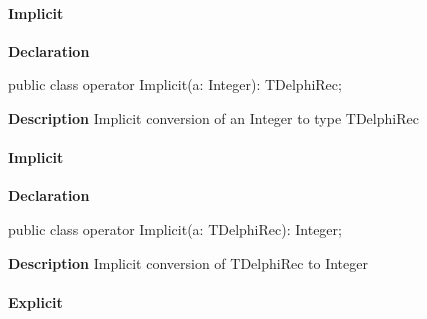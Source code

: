 \documentclass{report}
\begin{document}
\paragraph*{Implicit}\hspace*{\fill}

\begin{list}{}{
\setlength{\itemindent}{0cm}
\setlength{\listparindent}{0cm}
\setlength{\leftmargin}{\evensidemargin}
\addtolength{\leftmargin}{\tmplength}
\settowidth{\labelsep}{X}
\addtolength{\leftmargin}{\labelsep}
\setlength{\labelwidth}{\tmplength}
}
\begin{flushleft}
\item[\textbf{Declaration}\hfill]
\begin{ttfamily}
public class operator Implicit(a: Integer): TDelphiRec;\end{ttfamily}


\end{flushleft}
\par
\item[\textbf{Description}]
Implicit conversion of an Integer to type TDelphiRec

\end{list}
\paragraph*{Implicit}\hspace*{\fill}

\begin{list}{}{
\setlength{\itemindent}{0cm}
\setlength{\listparindent}{0cm}
\setlength{\leftmargin}{\evensidemargin}
\addtolength{\leftmargin}{\tmplength}
\settowidth{\labelsep}{X}
\addtolength{\leftmargin}{\labelsep}
\setlength{\labelwidth}{\tmplength}
}
\begin{flushleft}
\item[\textbf{Declaration}\hfill]
\begin{ttfamily}
public class operator Implicit(a: TDelphiRec): Integer;\end{ttfamily}


\end{flushleft}
\par
\item[\textbf{Description}]
Implicit conversion of TDelphiRec to Integer

\end{list}
\paragraph*{Explicit}\hspace*{\fill}
\end{document}
